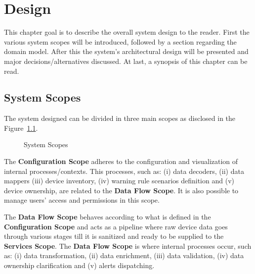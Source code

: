 \chapter{Design}
\label{chap:design}

This chapter goal is to describe the overall system design to the reader.
First the various system scopes will be introduced, followed by a section regarding the domain model.
After this the system's architectural design will be presented and major decisions/alternatives discussed. At last, a synopsis of this chapter can be read.



\section{System Scopes}
\label{sec:design:system_scopes}

The system designed can be divided in three main scopes as disclosed in the Figure~\ref{fig:design:system_scopes:scopes}.

\begin{figure}[H]
    \centering
   \resizebox{\columnwidth}{!}
   {
      
   }
   \caption[System Scopes]{System Scopes}
   \label{fig:design:system_scopes:scopes}
\end{figure}

The \textbf{Configuration Scope} adheres to the configuration and visualization of internal processes/contexts. This processes, such as: (i) data decoders, (ii) data mappers (iii) device inventory, (iv) warning rule scenarios definition and (v) device ownership, are related to the \textbf{Data Flow Scope}. It is also possible to manage users' access and permissions in this scope.

The \textbf{Data Flow Scope} behaves according to what is defined in the \textbf{Configuration Scope} and acts as a pipeline where raw device data goes through various stages till it is sanitized and ready to be supplied to the \textbf{Services Scope}. The \textbf{Data Flow Scope} is where internal processes occur, such as: (i) data transformation, (ii) data enrichment, (iii) data validation, (iv) data ownership clarification and (v) alerts dispatching.

